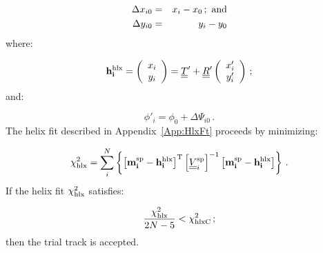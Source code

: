 \begin{eqnarray}
  \Delta x_{i0} & = & x_i - x_0 \, ; {\rm~and}  \\
  \Delta y_{i0} & = & y_i - y_0
\end{eqnarray}
where:

\begin{equation}
  {\bf h^{\rm hlx}_i} = 
  \left(
      \begin{array}{cc}
         x_i                                                       \\
         y_i
      \end{array}
  \right)                 =
  \underline{\underline{T}}' + \underline{\underline{R}}'
  \left(
      \begin{array}{cc}
         x'_i                                                      \\
         y'_i
      \end{array}
  \right) \, ;
\end{equation}
and:

\begin{equation}
  \phi'_i = \phi_0 + \Delta \Psi_{i0} \, .
\end{equation}
The helix fit described in Appendix~\ref{App:HlxFt} proceeds by minimizing:

\begin{equation}
  \chi^2_{\rm hlx} = 
    \sum_i^N \left\{
      \left[ {\bf m^{\rm sp}_i} - {\bf h^{\rm hlx}_i} \right]^{\rm T}
      \left[ \underline{\underline{V}}^{\rm sp}_i \right]^{-1}
      \left[ {\bf m^{\rm sp}_i} - {\bf h^{\rm hlx}_i} \right] 
  \right\}\, .
\end{equation}
If the helix fit $\chi^2_{\rm hlx}$ satisfies:

\begin{equation}
  \frac{\chi^2_{\rm hlx}}{2N-5} < \chi^2_{\rm hlx C} \, ;
\end{equation}
then the trial track is accepted.
